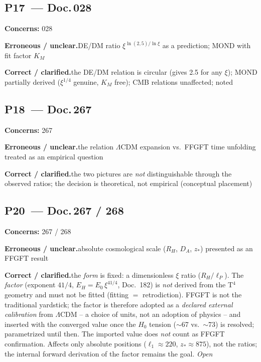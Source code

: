 \medskip


\subsection*{P17~--- Doc.\,028}

\noindent\textbf{Concerns:} 028


\smallskip\noindent\textbf{Erroneous / unclear.}\quad DE/DM ratio $\xi^{\ln(2{,}5)/\ln\xi}$ as a prediction; MOND with fit factor $K_M$


\smallskip\noindent\textbf{Correct / clarified.}\quad the DE/DM relation is circular (gives 2.5 for any $\xi$); MOND partially derived ($\xi^{1/4}$ genuine, $K_M$ free); CMB relations unaffected; noted


\medskip


\subsection*{P18~--- Doc.\,267}

\noindent\textbf{Concerns:} 267


\smallskip\noindent\textbf{Erroneous / unclear.}\quad the relation $\Lambda$CDM expansion vs.\ FFGFT time unfolding treated as an empirical question


\smallskip\noindent\textbf{Correct / clarified.}\quad the two pictures are \emph{not} distinguishable through the observed ratios; the decision is theoretical, not empirical (conceptual placement)


\medskip


\subsection*{P20~--- Doc.\,267 / 268}

\noindent\textbf{Concerns:} 267 / 268


\smallskip\noindent\textbf{Erroneous / unclear.}\quad absolute cosmological scale ($R_H$, $D_A$, $z_*$) presented as an FFGFT result


\smallskip\noindent\textbf{Correct / clarified.}\quad the \emph{form} is fixed: a dimensionless $\xi$ ratio ($R_H/\ell_P$). The \emph{factor} (exponent $41/4$, $E_H = E_0\,\xi^{41/4}$, Doc.~182) is \emph{not} derived from the T$^4$ geometry and must not be fitted (fitting $=$ retrodiction). FFGFT is not the traditional yardstick; the factor is therefore adopted as a \emph{declared external calibration} from $\Lambda$CDM -- a choice of units, not an adoption of physics -- and inserted with the converged value once the $H_0$ tension ($\sim$67 vs.\ $\sim$73) is resolved; parametrized until then. The imported value does \emph{not} count as FFGFT confirmation. Affects only absolute positions ($\ell_1\approx220$, $z_*\approx875$), not the ratios; the internal forward derivation of the factor remains the goal. \emph{Open}


